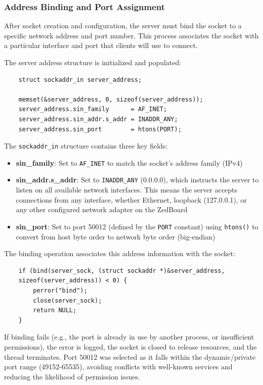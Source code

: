 \subsubsection{Address Binding and Port Assignment}

After socket creation and configuration, the server must bind the socket to a specific network address and port number. This process associates the socket with a particular interface and port that clients will use to connect.

The server address structure is initialized and populated:

\begin{verbatim}
	struct sockaddr_in server_address;
	
	memset(&server_address, 0, sizeof(server_address));
	server_address.sin_family      = AF_INET;
	server_address.sin_addr.s_addr = INADDR_ANY;
	server_address.sin_port        = htons(PORT);
\end{verbatim}

The \texttt{sockaddr\_in} structure contains three key fields:

\begin{itemize}
	\item \textbf{sin\_family}: Set to \texttt{AF\_INET} to match the socket's address family (IPv4)
	\item \textbf{sin\_addr.s\_addr}: Set to \texttt{INADDR\_ANY} (0.0.0.0), which instructs the server to listen on all available network interfaces. This means the server accepts connections from any interface, whether Ethernet, loopback (127.0.0.1), or any other configured network adapter on the ZedBoard
	\item \textbf{sin\_port}: Set to port 50012 (defined by the \texttt{PORT} constant) using \texttt{htons()} to convert from host byte order to network byte order (big-endian)
\end{itemize}

The binding operation associates this address information with the socket:

\begin{verbatim}
	if (bind(server_sock, (struct sockaddr *)&server_address,
	sizeof(server_address)) < 0) {
		perror("bind"); 
		close(server_sock); 
		return NULL;
	}
\end{verbatim}

If binding fails (e.g., the port is already in use by another process, or insufficient permissions), the error is logged, the socket is closed to release resources, and the thread terminates. Port 50012 was selected as it falls within the dynamic/private port range (49152-65535), avoiding conflicts with well-known services and reducing the likelihood of permission issues.

